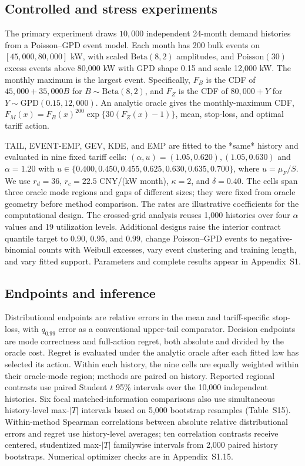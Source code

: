 \documentclass[suppldata]{interact}
\begin{document}
\subsection{Controlled and stress experiments}
The primary experiment draws $10{,}000$ independent 24-month demand
histories from a Poisson--GPD event model. Each month has 200 bulk
events on $[45{,}000,80{,}000]$ kW, with scaled $\mathrm{Beta}(8,2)$
amplitudes, and $\mathrm{Poisson}(30)$ excess events above 80,000 kW
with GPD shape 0.15 and scale 12,000 kW. The monthly maximum is the
largest event. Specifically, $F_B$ is the CDF of
$45{,}000+35{,}000B$ for $B\sim\mathrm{Beta}(8,2)$, and $F_Z$
is the CDF of $80{,}000+Y$ for
$Y\sim\mathrm{GPD}(0.15,12{,}000)$. An analytic oracle gives
the monthly-maximum CDF,
$F_M(x)=F_B(x)^{200}\exp\{30(F_Z(x)-1)\}$, mean, stop-loss, and
optimal tariff action.

TAIL, EVENT-EMP, GEV, KDE, and EMP are fitted to the *same* history
and evaluated in nine fixed tariff cells: $(\alpha,u)=(1.05,0.620),
(1.05,0.630)$ and $\alpha=1.20$ with
$u\in\{0.400,0.450,0.455,0.625,0.630,0.635,0.700\}$,
where $u=\mu_F/S$. We use $r_d=36$, $r_c=22.5$ CNY/(kW month),
$\kappa=2$, and $\delta=0.40$. The cells span three oracle mode
regions and gaps of different sizes; they were fixed from oracle
geometry before method comparison. The rates are illustrative coefficients for the computational design.
The crossed-grid analysis reuses
1,000 histories over four $\alpha$ values and 19 utilization levels.
Additional designs raise the interior contract quantile target to
$0.90$, $0.95$, and $0.99$, change Poisson--GPD events to
negative-binomial counts with Weibull excesses, vary event clustering
and training length, and vary fitted support. Parameters and complete
results appear in Appendix~S1.

\subsection{Endpoints and inference}
\label{sec:controlled-mechanism}
Distributional endpoints are relative errors in the mean and
tariff-specific stop-loss, with $q_{0.99}$ error as a conventional
upper-tail comparator. Decision endpoints are mode correctness and
full-action regret, both absolute and divided by the oracle cost.
Regret is evaluated under the analytic oracle after each fitted law
has selected its action. Within each history, the nine cells are
equally weighted within their oracle-mode region; methods are paired
on history. Reported regional contrasts use paired Student $t$
95\% intervals over the 10,000 independent histories. Six focal
matched-information comparisons also use simultaneous history-level
max-$|T|$ intervals based on 5,000 bootstrap resamples (Table~S15). Within-method Spearman correlations between absolute relative
distributional errors and regret use history-level averages;
ten correlation contrasts receive centered, studentized max-$|T|$
familywise intervals from 2,000 paired history bootstraps. Numerical
optimizer checks are in Appendix~S1.15.
\end{document}
